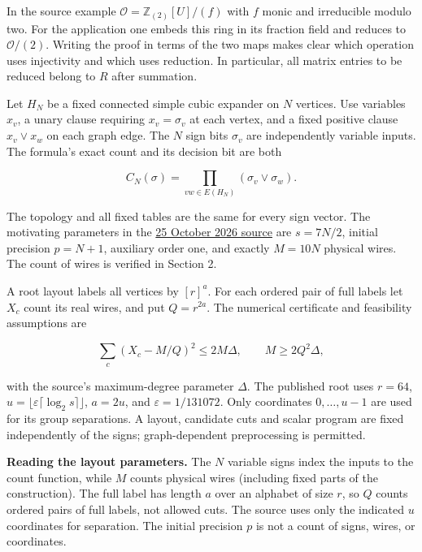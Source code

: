 \documentclass[
  11pt,
]{article}
\begin{document}
In the source example \(\mathcal O=\mathbb Z_{(2)}[U]/(f)\) with
\(f\) monic and irreducible modulo two. For the application one embeds
this ring in its fraction field and reduces to \(\mathcal O/(2)\).
Writing the proof in terms of the two maps makes clear which operation
uses injectivity and which uses reduction. In particular, all matrix
entries to be reduced belong to \(R\) after summation.

Let \(H_N\) be a fixed connected simple cubic expander on \(N\)
vertices. Use variables \(x_v\), a unary clause requiring
\(x_v=\sigma_v\) at each vertex, and a fixed positive clause
\(x_v\lor x_w\) on each graph edge. The \(N\) sign bits \(\sigma_v\) are
independently variable inputs. The formula's exact count and its
decision bit are both

\[
C_N(\sigma)=\prod_{vw\in E(H_N)}(\sigma_v\lor\sigma_w).
\tag{A}
\]

The topology and all fixed tables are the same for every sign vector.
The motivating parameters in the \href{https://github.com/openai/math/tree/main/preprints/The-Exponential-Time-Hypothesis-is-False-October-25-2026}{25 October 2026 source} are \(s=7N/2\), initial precision \(p=N+1\),
auxiliary order one, and exactly \(M=10N\) physical wires. The count of
wires is verified in Section 2.

A root layout labels all vertices by \([r]^a\). For each ordered pair of
full labels let \(X_c\) count its real wires, and put \(Q=r^{2a}\). The
numerical certificate and feasibility assumptions are

\[
\sum_c(X_c-M/Q)^2\le2M\Delta,\qquad M\ge2Q^2\Delta,
\tag{B}
\]

with the source's maximum-degree parameter \(\Delta\). The published
root uses \(r=64\), \(u=\lfloor\varepsilon\lceil\log_2s\rceil\rfloor\),
\(a=2u\), and \(\varepsilon=1/131072\). Only coordinates
\(0,\ldots,u-1\) are used for its group separations. A layout, candidate
cuts and scalar program are fixed independently of the signs;
graph-dependent preprocessing is permitted.

\textbf{Reading the layout parameters.} The \(N\) variable signs index
the inputs to the count function, while \(M\) counts physical wires
(including fixed parts of the construction). The full label has length
\(a\) over an alphabet of size \(r\), so \(Q\) counts ordered pairs of
full labels, not allowed cuts. The source uses only the indicated
\(u\) coordinates for separation. The initial precision \(p\) is not
a count of signs, wires, or coordinates.
\end{document}
